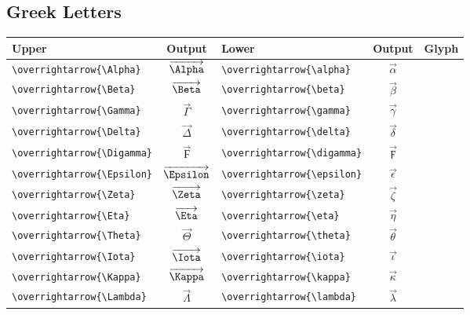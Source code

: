 \documentclass[12pt,a4paper]{article}
\begin{document}
\subsection*{Greek Letters}
\begin{longtable}{|l|c|l|c|c|}
\hline
\textbf{Upper}                      & \textbf{Output}             & \textbf{Lower}                      & \textbf{Output}                & \textbf{Glyph} \\
\hline
\verb|\overrightarrow{\Alpha}|      & $\overrightarrow{\Alpha}$   & \verb|\overrightarrow{\alpha}|      & $\overrightarrow{\alpha}$      & \\
\verb|\overrightarrow{\Beta}|       & $\overrightarrow{\Beta}$    & \verb|\overrightarrow{\beta}|       & $\overrightarrow{\beta}$       & \\
\verb|\overrightarrow{\Gamma}|      & $\overrightarrow{\Gamma}$   & \verb|\overrightarrow{\gamma}|      & $\overrightarrow{\gamma}$      & \\
\verb|\overrightarrow{\Delta}|      & $\overrightarrow{\Delta}$   & \verb|\overrightarrow{\delta}|      & $\overrightarrow{\delta}$      & \\
\verb|\overrightarrow{\Digamma}|    & $\overrightarrow{\Digamma}$ & \verb|\overrightarrow{\digamma}|    & $\overrightarrow{\digamma}$    & \\
\verb|\overrightarrow{\Epsilon}|    & $\overrightarrow{\Epsilon}$ & \verb|\overrightarrow{\epsilon}|    & $\overrightarrow{\epsilon}$    & \\
\verb|\overrightarrow{\Zeta}|       & $\overrightarrow{\Zeta}$    & \verb|\overrightarrow{\zeta}|       & $\overrightarrow{\zeta}$       & \\
\verb|\overrightarrow{\Eta}|        & $\overrightarrow{\Eta}$     & \verb|\overrightarrow{\eta}|        & $\overrightarrow{\eta}$        & \\
\verb|\overrightarrow{\Theta}|      & $\overrightarrow{\Theta}$   & \verb|\overrightarrow{\theta}|      & $\overrightarrow{\theta}$      & \\
\verb|\overrightarrow{\Iota}|       & $\overrightarrow{\Iota}$    & \verb|\overrightarrow{\iota}|       & $\overrightarrow{\iota}$       & \\
\verb|\overrightarrow{\Kappa}|      & $\overrightarrow{\Kappa}$   & \verb|\overrightarrow{\kappa}|      & $\overrightarrow{\kappa}$      & \\
\verb|\overrightarrow{\Lambda}|     & $\overrightarrow{\Lambda}$  & \verb|\overrightarrow{\lambda}|     & $\overrightarrow{\lambda}$     & \\

\end{longtable}
\end{document}

